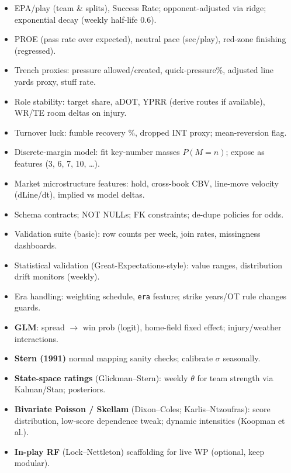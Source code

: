 \begin{itemize}
  \item {} EPA/play (team \& splits), Success Rate; opponent-adjusted via ridge; exponential decay (weekly half-life 0.6).
  \item {} PROE (pass rate over expected), neutral pace (sec/play), red-zone finishing (regressed).
  \item {} Trench proxies: pressure allowed/created, quick-pressure\%, adjusted line yards proxy, stuff rate.
  \item {} Role stability: target share, aDOT, YPRR (derive routes if available), WR/TE room deltas on injury.
  \item {} Turnover luck: fumble recovery \%, dropped INT proxy; mean-reversion flag.
  \item {} Discrete-margin model: fit key-number masses $P(M=n)$; expose as features (3, 6, 7, 10, \dots).
  \item {} Market microstructure features: hold, cross-book CBV, line-move velocity (dLine/dt), implied vs model deltas.
\end{itemize}

\begin{itemize}
  \item {} Schema contracts; NOT NULLs; FK constraints; de-dupe policies for odds.
  \item {} Validation suite (basic): row counts per week, join rates, missingness dashboards.
  \item {} Statistical validation (Great-Expectations-style): value ranges, distribution drift monitors (weekly).
  \item {} Era handling: weighting schedule, \texttt{era} feature; strike years/OT rule changes guards.
\end{itemize}

\begin{itemize}
  \item {} \textbf{GLM}: spread $\to$ win prob (logit), home-field fixed effect; injury/weather interactions.
  \item {} \textbf{Stern (1991)} normal mapping sanity checks; calibrate $\sigma$ seasonally.
  \item {} \textbf{State-space ratings} (Glickman--Stern): weekly $\theta$ for team strength via Kalman/Stan; posteriors.
  \item {} \textbf{Bivariate Poisson / Skellam} (Dixon--Coles; Karlis--Ntzoufras): score distribution, low-score dependence tweak; dynamic intensities (Koopman et al.).
  \item {} \textbf{In-play RF} (Lock--Nettleton) scaffolding for live WP (optional, keep modular).
\end{itemize}

